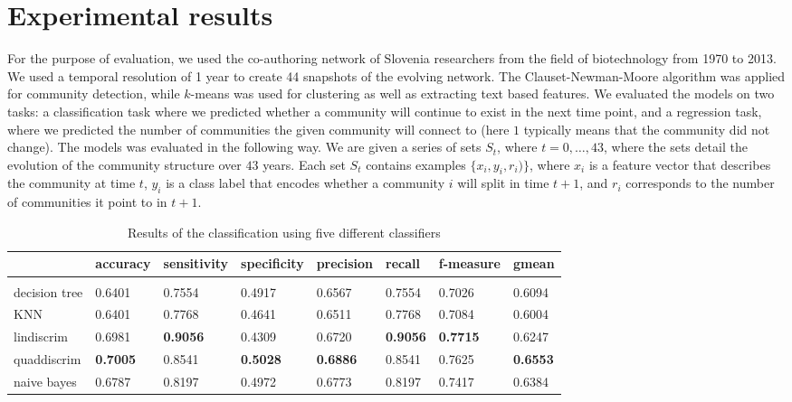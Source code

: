 \documentclass{article} %
\begin{document}
\section{Experimental results}

For the purpose of evaluation, we used the co-authoring network of Slovenia researchers from the field of biotechnology from 1970 to 2013. We used a temporal resolution of 1 year to create 44 snapshots of the evolving network. The Clauset-Newman-Moore algorithm was applied for community detection, while $k$-means  was used for clustering as well as extracting text based features. We evaluated the models on two tasks: a classification task where we predicted whether a community will continue to exist in the next time point, and a regression task, where we predicted the number of communities the given community will connect to (here $1$ typically means that the community did not change). The models was evaluated in the following way. We are given a series of sets $S_t$, where $t = 0,\ldots, 43$, where the sets detail the evolution of the community structure over $43$ years. Each set $S_t$ contains examples $\{x_i, y_i, r_i)\}$, where $x_i$ is a feature vector that describes the community at time $t$, $y_i$ is a class label that encodes whether a community $i$ will split in time $t+1$, and $r_i$ corresponds to the number of communities it point to in $t+1$.

\begin{table}[h]
\caption{Results of the classification using five different classifiers}
\label{classification}
\begin{center}
\begin{tabular}{@{}llllllll@{}}
                 & accuracy & sensitivity & specificity & precision & recall & f-measure & gmean \\
                 \hline \\
decision tree    & 0.6401   & 0.7554      & 0.4917      & 0.6567    & 0.7554 & 0.7026     & 0.6094 \\
KNN              & 0.6401   & 0.7768      & 0.4641      & 0.6511    & 0.7768 & 0.7084     & 0.6004 \\
lindiscrim       & 0.6981   & \textbf{0.9056}      & 0.4309      & 0.6720    & \textbf{0.9056} & \textbf{0.7715}     & 0.6247 \\
quaddiscrim      & \textbf{0.7005}   & 0.8541      & \textbf{0.5028}      & \textbf{0.6886}    & 0.8541 & 0.7625     & \textbf{0.6553} \\
naive bayes      & 0.6787   & 0.8197      & 0.4972      & 0.6773    & 0.8197 & 0.7417     & 0.6384 \\  
\end{tabular}
\end{center}
\end{table}
\end{document}

